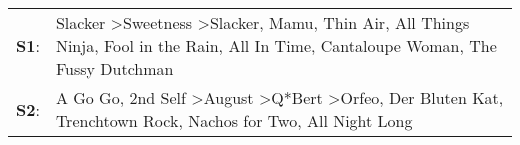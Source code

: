 \begin{supertabular}{p{0.03\textwidth}p{0.92\textwidth}}
 \textbf{S1}:  &  Slacker\textsuperscript{} \textgreater \enspace Sweetness\textsuperscript{} \textgreater \enspace Slacker\textsuperscript{}, \enspace Mamu\textsuperscript{}, \enspace Thin Air\textsuperscript{}, \enspace All Things Ninja\textsuperscript{}, \enspace Fool in the Rain\textsuperscript{}, \enspace All In Time\textsuperscript{}, \enspace Cantaloupe Woman\textsuperscript{}, \enspace The Fussy Dutchman\textsuperscript{}  \enspace  \\
 \textbf{S2}:  &                                          A Go Go\textsuperscript{}, \enspace 2nd Self\textsuperscript{} \textgreater \enspace August\textsuperscript{} \textgreater \enspace Q*Bert\textsuperscript{} \textgreater \enspace Orfeo\textsuperscript{}, \enspace Der Bluten Kat\textsuperscript{}, \enspace Trenchtown Rock\textsuperscript{}, \enspace Nachos for Two\textsuperscript{}, \enspace All Night Long\textsuperscript{}  \enspace  \\
\end{supertabular}
